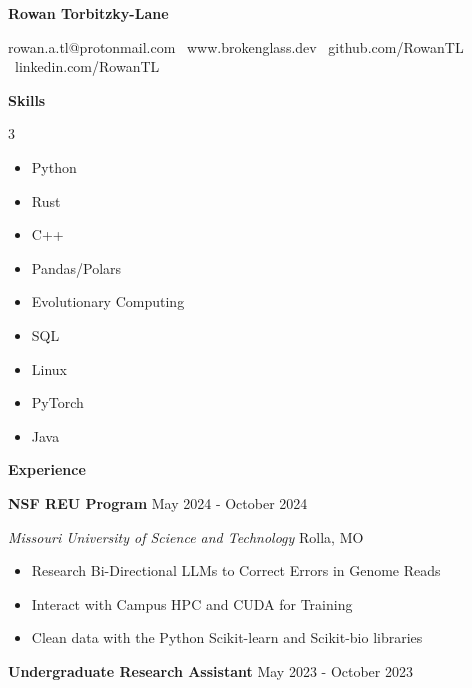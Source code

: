 \documentclass[11pt]{article}
\begin{document}
\begin{center}
    \textbf{\huge Rowan Torbitzky-Lane}\\
    \hrulefill
\end{center}

\begin{center}
    rowan.a.tl@protonmail.com \textbullet \ www.brokenglass.dev \textbullet \ github.com/RowanTL \textbullet  \ linkedin.com/RowanTL
\end{center}


\begin{center}
    \textbf{Skills}
\end{center}

\begin{multicols}{3}
    \begin{itemize}[noitemsep, topsep=0pt, partopsep=0pt, parsep=0pt, itemsep=0pt]
        \item Python
        \item Rust
        \item C++
        \item Pandas/Polars
        \item Evolutionary Computing
        \item SQL
        \item Linux
        \item PyTorch
        \item Java
    \end{itemize}
\end{multicols}

\begin{center}
    \textbf{Experience}
\end{center}

\textbf{NSF REU Program} \hfill May 2024 - October 2024

\textsl{Missouri University of Science and Technology} \hfill Rolla, MO
\begin{itemize}[noitemsep, topsep=0pt, partopsep=0pt, parsep=0pt, itemsep=0pt]
    \item Research Bi-Directional LLMs to Correct Errors in Genome Reads
    \item Interact with Campus HPC and CUDA for Training
    \item Clean data with the Python Scikit-learn and Scikit-bio libraries
\end{itemize}


\textbf{Undergraduate Research Assistant} \hfill May 2023 - October 2023
\end{document}
